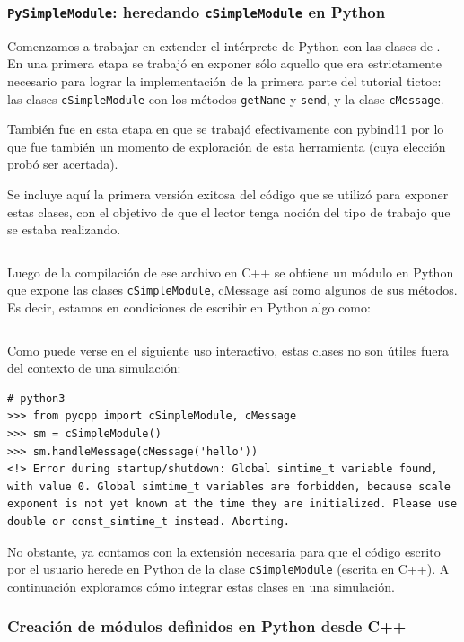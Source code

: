 \documentclass[]{article}
\begin{document}
\subsubsection{\texttt{PySimpleModule}: heredando \texttt{cSimpleModule} en Python}

Comenzamos a trabajar en extender el intérprete de Python con las clases de
\omnetpp{}. En una primera etapa se trabajó en exponer sólo aquello que era
estrictamente necesario para lograr la implementación de la primera parte del
tutorial tictoc: las clases \verb!cSimpleModule! con los métodos
\verb!getName! y \verb!send!, y la clase \verb!cMessage!.

También fue en esta etapa en que se trabajó efectivamente con pybind11 por lo
que fue también un momento de exploración de esta herramienta (cuya elección
probó ser acertada).

Se incluye aquí la primera versión exitosa del código que se utilizó para
exponer estas clases, con el objetivo de que el lector tenga noción del tipo de
trabajo que se estaba realizando.

\inputminted{c++}{codelistings/binding.cc}

Luego de la compilación de ese archivo en C++ se obtiene un módulo en Python
que expone las clases \verb!cSimpleModule!, cMessage así como algunos de sus
métodos. Es decir, estamos en condiciones de escribir en Python algo como:

\inputminted{Python}{codelistings/binding_usage.py}

Como puede verse en el siguiente uso interactivo, estas clases no son útiles
fuera del contexto de una simulación:

\begin{verbatim}
# python3
>>> from pyopp import cSimpleModule, cMessage
>>> sm = cSimpleModule()
>>> sm.handleMessage(cMessage('hello'))
<!> Error during startup/shutdown: Global simtime_t variable found, with value 0. Global simtime_t variables are forbidden, because scale exponent is not yet known at the time they are initialized. Please use double or const_simtime_t instead. Aborting.
\end{verbatim}

No obstante, ya contamos con la extensión necesaria para que el código escrito
por el usuario herede en Python de la clase \verb!cSimpleModule! (escrita en
C++). A continuación exploramos cómo integrar estas clases en una simulación.

\subsubsection{Creación de módulos definidos en Python desde C++}
\end{document}
